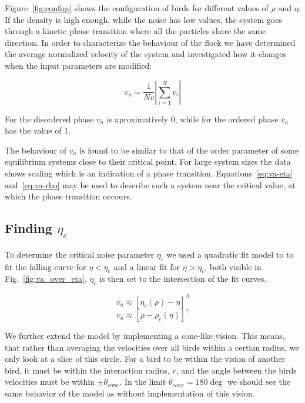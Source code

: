 \documentclass[twoside,twocolumn]{article}
\begin{document}
Figure~\ref{fig:configs} shows the configuration of birds for different values of $\rho$ and $\eta$.  
If the density is high enough, while the noise has low values, the system goes through a kinetic phase transition where all the particles share the same direction. In order to characterize the behaviour of the flock we have determined the average normalized velocity of the system and investigated how it changes when the input parameters are modified:

\begin{equation}
v_a=\frac{1}{Nv}\left\vert\sum_{i=1}^{N} v_i\right\vert
\end{equation}

For the disordered phase $v_a$ is aproximatively 0, while for the ordered phase $v_a$ has the value of 1.

The behaviour of $v_a$ is found to be similar to that of the order parameter of some equilibrium systems close to their critical point. For large system sizes the data shows scaling which is an indication of a phase transition. Equations~\eqref{eq:va-eta} and~\eqref{eq:va-rho} may be used to describe such a system near the critical value, at which the phase transition occours. 

\subsection{Finding $\eta_c$}
To determine the critical noise parameter $\eta_c$ we used a quadratic fit model
to to fit the falling curve for $\eta < \eta_c$ and a linear fit for $\eta > 
\eta_c$, both visible in Fig.~\ref{fig:va_over_eta}. $\eta_c$ is then set to 
the intersection of the fit curves. 





\begin{equation}
  \label{eq:va-eta}
  v_a \approx[\eta_c(\rho)-\eta]^\beta 
\end{equation}
\begin{equation}
  \label{eq:va-rho}
  v_a \approx[\rho-\rho_c(\eta)]^\gamma
\end{equation}

We further extend the model by implementing a cone-like vision. This means, that rather than averaging the velocities over all birds within a certian radius, we only look at a slice of this circle. For a bird to be within the vision of another bird, it must be within the interaction radius, $r$, and the angle between the birds velocities must be within $\pm \theta_{cone}$. In the limit $\theta_{cone} = 180 \deg$ we should see the same behavior of the model as without implementation of this vision.
\end{document}
